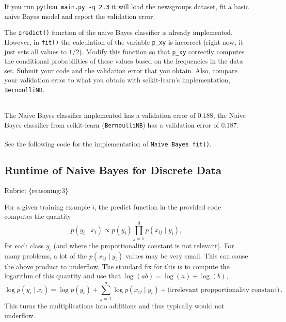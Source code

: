 \documentclass{article}
\def\rubric#1{\gre{Rubric: \{#1\}}}{}
\def\blu#1{{\color{blu}#1}}
\def\gre#1{{\color{gre}#1}}
\def\ans#1{{\color{ans}#1}}
\def\cond{\; | \;}
\begin{document}
If you run \texttt{python main.py -q 2.3}
it will load the newsgroups dataset, fit a basic naive Bayes model and report the validation error.

The \texttt{predict()} function of the naive Bayes classifier is already implemented.
However, in \texttt{fit()}
the calculation of the variable \texttt{p\_xy} is incorrect
(right now, it just sets all values to $1/2$).
\blu{Modify this function so that \texttt{p\_xy} correctly
computes the conditional probabilities of these values based on the
frequencies in the data set. Submit your code and the validation error that you obtain.
Also, compare your validation error to what you obtain with scikit-learn's implementation, \texttt{BernoulliNB}.} \\ \\
\ans{
   The Naive Bayes classifier implemented has a validation error of $0.188$, the Naive Bayes classifier 
   from scikit-learn (\texttt{BernoulliNB}) has a validation error of $0.187$. \\ \\
   See the following code for the implementation of \texttt{Naive Bayes fit()}.\\
   \begin{center}
      
  \end{center}
}

\subsection{Runtime of Naive Bayes for Discrete Data}
\rubric{reasoning:3}

For a given training example $i$, the predict function in the provided code computes the quantity
\[
p(y_i \cond x_i) \propto p(y_i)\prod_{j=1}^d p(x_{ij} \cond y_i),
\]
for each class $y_i$ (and where the proportionality constant is not relevant). For many problems, a lot of the $p(x_{ij} \cond y_i)$ values may be very small. This can cause the above product to underflow. The standard fix for this is to compute the logarithm of this quantity and use that $\log(ab) = \log(a)+\log(b)$,
\[
\log p(y_i \cond x_i) = \log p(y_i) + \sum_{j=1}^d \log p(x_{ij} \cond y_i) + \text{(irrelevant propportionality constant)} \, .
\]
This turns the multiplications into additions and thus typically would not underflow.
\end{document}
